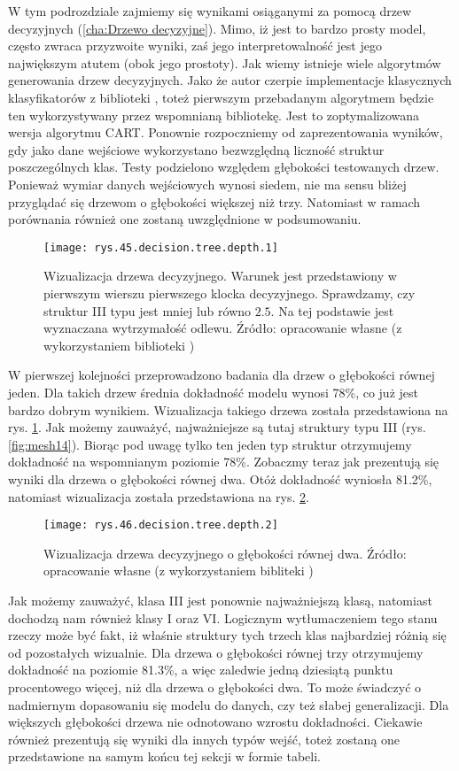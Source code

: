 W tym podrozdziale zajmiemy się wynikami osiąganymi za pomocą drzew decyzyjnych (\ref{cha:Drzewo decyzyjne}). Mimo, iż jest to bardzo prosty model, często zwraca przyzwoite wyniki, zaś jego interpretowalność jest jego największym atutem (obok jego prostoty). 
Jak wiemy istnieje wiele algorytmów generowania drzew decyzyjnych. Jako że autor czerpie implementacje klasycznych klasyfikatorów z biblioteki , toteż pierwszym przebadanym algorytmem będzie ten wykorzystywany przez wspomnianą bibliotekę. Jest to zoptymalizowana wersja algorytmu CART.
Ponownie rozpoczniemy od zaprezentowania wyników, gdy jako dane wejściowe wykorzystano bezwzględną liczność struktur poszczególnych klas. Testy podzielono względem głębokości testowanych drzew. Ponieważ wymiar danych wejściowych wynosi siedem, nie ma sensu bliżej przyglądać się drzewom o głębokości większej niż trzy. Natomiast w ramach porównania również one zostaną uwzględnione w podsumowaniu. 
\begin{figure}[h]
    \centering
    \texttt{[image: rys.45.decision.tree.depth.1]}
    \caption{Wizualizacja drzewa decyzyjnego. Warunek jest przedstawiony w pierwszym wierszu pierwszego klocka decyzyjnego. Sprawdzamy, czy struktur III typu jest mniej lub równo $2.5$. Na tej podstawie jest wyznaczana wytrzymałość odlewu. Źródło: opracowanie własne (z wykorzystaniem biblioteki )}
    \label{rys.45.decision.tree.depth.1}
\end{figure}
W pierwszej kolejności przeprowadzono badania dla drzew o głębokości równej jeden. Dla takich drzew średnia dokładność modelu wynosi 78\%, co już jest bardzo dobrym wynikiem. Wizualizacja takiego drzewa została przedstawiona na rys. \ref{rys.45.decision.tree.depth.1}. 
Jak możemy zauważyć, najważniejsze są tutaj struktury typu III (rys. \ref{fig:mesh14}). Biorąc pod uwagę tylko ten jeden typ struktur otrzymujemy dokładność na wspomnianym poziomie 78\%. Zobaczmy teraz jak prezentują się wyniki dla drzewa o głębokości równej dwa. Otóż dokładność wyniosła 81.2\%, natomiast wizualizacja została przedstawiona na rys. \ref{rys.46.decision.tree.depth.2}. 
\begin{figure}[h]
    \centering
    \texttt{[image: rys.46.decision.tree.depth.2]}
    \caption{Wizualizacja drzewa decyzyjnego o głębokości równej dwa. Źródło: opracowanie własne (z wykorzystaniem bibliteki )}
    \label{rys.46.decision.tree.depth.2}
\end{figure}
Jak możemy zauważyć, klasa III jest ponownie najważniejszą klasą, natomiast dochodzą nam również klasy I oraz VI. Logicznym wytłumaczeniem tego stanu rzeczy może być fakt, iż właśnie struktury tych trzech klas najbardziej różnią się od pozostałych wizualnie. Dla drzewa o głębokości równej trzy otrzymujemy dokładność na poziomie 81.3\%, a więc zaledwie jedną dziesiątą punktu procentowego więcej, niż dla drzewa o głębokości dwa. To może świadczyć o nadmiernym dopasowaniu się modelu do danych, czy też słabej generalizacji. Dla większych głębokości drzewa nie odnotowano wzrostu dokładności. Ciekawie również prezentują się wyniki dla innych typów wejść, toteż zostaną one przedstawione na samym końcu tej sekcji w formie tabeli. 

